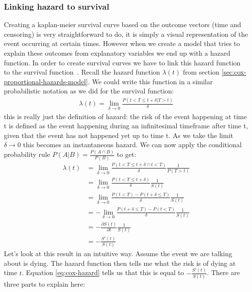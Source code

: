 \subsubsection{Linking hazard to survival}
Creating a kaplan-meier survival curve based on the outcome vectors (time and censoring) is very straightforward to do, it is simply a visual representation of the event occurring at certain times. However when we create a model that tries to explain these outcomes from explanatory variables we end up with a hazard function. In order to create survival curves we have to link this hazard function to the survival function~\cite{survivalmodels}. Recall the hazard function $\lambda(t)$ from section \ref{sec:cox-proportional-hazards-model}. We could write this function in a similar probabilistic notation as we did for the survival function:
\begin{equation}
\begin{split}
\lambda(t) = \lim\limits_{\delta\rightarrow0}\frac{P(t < T \leq t+\delta | T  > t)}{\delta}
\end{split}
\end{equation}
this is really just the definition of hazard: the risk of the event happening at time t is defined as the event happening during an infinitesimal timeframe after time t, given that the event has not happened yet up to time t. As we take the limit $\delta\rightarrow0$ this becomes an instantaneous hazard. We can now apply the conditional probability rule $P(A|B) = \frac{P(A \cap B)}{P(B)}$ to get:
\begin{equation}
\begin{split}
\label{eq:cox-hazard}
\lambda(t) &= \lim\limits_{\delta\rightarrow0}\frac{P(t < T \leq t+\delta \cap t < T)}{\delta}\frac{1}{P(T>t)} \\
&= \lim\limits_{\delta\rightarrow0}\frac{P(t < T \leq t+\delta)}{\delta}\frac{1}{S(t)} \\
&= \lim\limits_{\delta\rightarrow0}\frac{P(t < T) - P(t+\delta\leq T)}{\delta}\frac{1}{S(t)} \\
&= -\lim\limits_{\delta\rightarrow0}\frac{P(t+\delta\leq T) - P(t < T)}{\delta}\frac{1}{S(t)} \\
&= -\frac{\partial S(t)}{\partial t}\frac{1}{S(t)} \\
&= -\frac{S'(t)}{S(t)}
\end{split}
\end{equation}
Let's look at this result in an intuitive way. Assume the event we are talking about is dying. The hazard function then tells me what the risk is of dying at time $t$. Equation \ref{eq:cox-hazard} tells us that this is equal to $-\frac{S'(t)}{S(t)}$. There are three parts to explain here:
